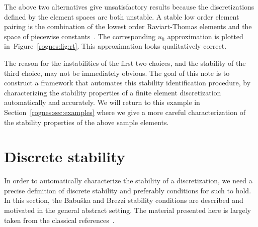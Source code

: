 The above two alternatives give unsatisfactory results because the
discretizations defined by the element spaces are both unstable. A
stable low order element pairing is the combination of the lowest
order Raviart-Thomas elements and the space of piecewise
constants~\cite{RaviartThomas1977}. The corresponding $u_h$
approximation is plotted in~Figure~\ref{rognes:fig:rt}. This
approximation looks qualitatively correct.

The reason for the instabilities of the first two choices, and the
stability of the third choice, may not be immediately obvious. The
goal of this note is to construct a framework that automates this
stability identification procedure, by characterizing the stability
properties of a finite element discretization automatically and
accurately.  We will return to this example in
Section~\ref{rognes:sec:examples} where we give a more careful
characterization of the stability properties of the above sample
elements.



\section{Discrete stability}

In order to automatically characterize the stability of a
discretization, we need a precise definition of discrete stability and
preferably conditions for such to hold. In this section, the Babu\v
ska and Brezzi stability conditions are described and motivated in the
general abstract setting. The material presented here is largely taken
from the classical references~\cite{Babuska1973, Brezzi1974,
  BrezziFortin1991}.

